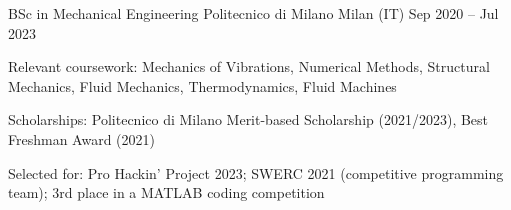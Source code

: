 
\cventry
{BSc in Mechanical Engineering}
{Politecnico di Milano}
{Milan (IT)}
{Sep 2020 -- Jul 2023}
{
    \begin{cvitems}
        \item {Relevant coursework: Mechanics of Vibrations, Numerical Methods, Structural Mechanics, Fluid Mechanics, Thermodynamics, Fluid Machines}
        \item {Scholarships: Politecnico di Milano Merit-based Scholarship (2021/2023), Best Freshman Award (2021)}
        \ifdefined\IsCV
            \item {Selected for: Pro Hackin' Project 2023; SWERC 2021 (competitive programming team); 3rd place in a MATLAB coding competition}
        \fi
    \end{cvitems}
}